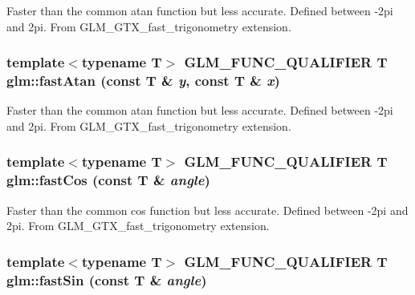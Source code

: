 Faster than the common atan function but less accurate. Defined between -2pi and 2pi. From GLM\_\-GTX\_\-fast\_\-trigonometry extension. \hypertarget{group__gtx__fast__trigonometry_gc6605aad8dce8278938f58b6e68b036a}{
\subsubsection[fastAtan]{\setlength{\rightskip}{0pt plus 5cm}template$<$typename T$>$ GLM\_\-FUNC\_\-QUALIFIER T glm::fastAtan (const T \& {\em y}, \/  const T \& {\em x})}}
\label{group__gtx__fast__trigonometry_gc6605aad8dce8278938f58b6e68b036a}


Faster than the common atan function but less accurate. Defined between -2pi and 2pi. From GLM\_\-GTX\_\-fast\_\-trigonometry extension. \hypertarget{group__gtx__fast__trigonometry_g40743124db6dc2a59de72aa81bc1cf93}{
\subsubsection[fastCos]{\setlength{\rightskip}{0pt plus 5cm}template$<$typename T$>$ GLM\_\-FUNC\_\-QUALIFIER T glm::fastCos (const T \& {\em angle})}}
\label{group__gtx__fast__trigonometry_g40743124db6dc2a59de72aa81bc1cf93}


Faster than the common cos function but less accurate. Defined between -2pi and 2pi. From GLM\_\-GTX\_\-fast\_\-trigonometry extension. \hypertarget{group__gtx__fast__trigonometry_g2f7a014f1fb9b16ede8b0cac0beba9f1}{
\subsubsection[fastSin]{\setlength{\rightskip}{0pt plus 5cm}template$<$typename T$>$ GLM\_\-FUNC\_\-QUALIFIER T glm::fastSin (const T \& {\em angle})}}
\label{group__gtx__fast__trigonometry_g2f7a014f1fb9b16ede8b0cac0beba9f1}


